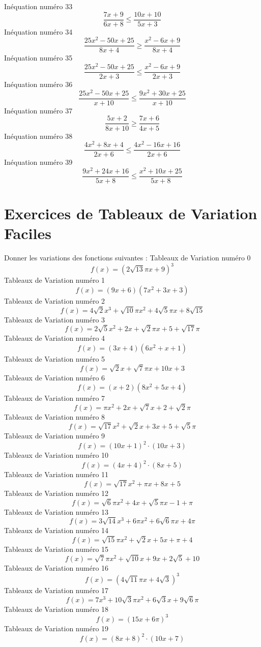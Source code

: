 \documentclass{article}
\begin{document}
\geq {}\]In\'equation num\'ero 33 \[\frac{7 x + 9}{6 x + 8} \leq \frac{10 x + 10}{5 x + 3}\]In\'equation num\'ero 34 \[\frac{25 x^{2} - 50 x + 25}{8 x + 4} \geq \frac{x^{2} - 6 x + 9}{8 x + 4}\]In\'equation num\'ero 35 \[\frac{25 x^{2} - 50 x + 25}{2 x + 3} \leq \frac{x^{2} - 6 x + 9}{2 x + 3}\]In\'equation num\'ero 36 \[\frac{25 x^{2} - 50 x + 25}{x + 10} \leq \frac{9 x^{2} + 30 x + 25}{x + 10}\]In\'equation num\'ero 37 \[\frac{5 x + 2}{8 x + 10} \geq \frac{7 x + 6}{4 x + 5}\]In\'equation num\'ero 38 \[\frac{4 x^{2} + 8 x + 4}{2 x + 6} \leq \frac{4 x^{2} - 16 x + 16}{2 x + 6}\]In\'equation num\'ero 39 \[\frac{9 x^{2} + 24 x + 16}{5 x + 8} \leq \frac{x^{2} + 10 x + 25}{5 x + 8}\]
 \section{Exercices de Tableaux de Variation Faciles}

 Donner les variations des fonctions suivantes : 
Tableaux de Variation num\'ero 0 \[f(x) = \left(2 \sqrt{13} \pi x + 9\right)^{3}\]Tableaux de Variation num\'ero 1 \[f(x) = \left(9 x + 6\right) \left(7 x^{2} + 3 x + 3\right)\]Tableaux de Variation num\'ero 2 \[f(x) = 4 \sqrt{2} x^{3} + \sqrt{10} \pi x^{2} + 4 \sqrt{5} \pi x + 8 \sqrt{15}\]Tableaux de Variation num\'ero 3 \[f(x) = 2 \sqrt{5} x^{2} + 2 x + \sqrt{2} \pi x + 5 + \sqrt{17} \pi\]Tableaux de Variation num\'ero 4 \[f(x) = \left(3 x + 4\right) \left(6 x^{2} + x + 1\right)\]Tableaux de Variation num\'ero 5 \[f(x) = \sqrt{2} x + \sqrt{7} \pi x + 10 x + 3\]Tableaux de Variation num\'ero 6 \[f(x) = \left(x + 2\right) \left(8 x^{2} + 5 x + 4\right)\]Tableaux de Variation num\'ero 7 \[f(x) = \pi x^{2} + 2 x + \sqrt{7} x + 2 + \sqrt{2} \pi\]Tableaux de Variation num\'ero 8 \[f(x) = \sqrt{17} x^{2} + \sqrt{2} x + 3 x + 5 + \sqrt{5} \pi\]Tableaux de Variation num\'ero 9 \[f(x) = \left(10 x + 1\right)^{2} \cdot \left(10 x + 3\right)\]Tableaux de Variation num\'ero 10 \[f(x) = \left(4 x + 4\right)^{2} \cdot \left(8 x + 5\right)\]Tableaux de Variation num\'ero 11 \[f(x) = \sqrt{17} x^{2} + \pi x + 8 x + 5\]Tableaux de Variation num\'ero 12 \[f(x) = \sqrt{6} \pi x^{2} + 4 x + \sqrt{5} \pi x - 1 + \pi\]Tableaux de Variation num\'ero 13 \[f(x) = 3 \sqrt{14} x^{3} + 6 \pi x^{2} + 6 \sqrt{6} \pi x + 4 \pi\]Tableaux de Variation num\'ero 14 \[f(x) = \sqrt{15} \pi x^{2} + \sqrt{2} x + 5 x + \pi + 4\]Tableaux de Variation num\'ero 15 \[f(x) = \sqrt{7} \pi x^{2} + \sqrt{10} x + 9 x + 2 \sqrt{5} + 10\]Tableaux de Variation num\'ero 16 \[f(x) = \left(4 \sqrt{11} \pi x + 4 \sqrt{3}\right)^{3}\]Tableaux de Variation num\'ero 17 \[f(x) = 7 x^{3} + 10 \sqrt{3} \pi x^{2} + 6 \sqrt{3} x + 9 \sqrt{6} \pi\]Tableaux de Variation num\'ero 18 \[f(x) = \left(15 x + 6 \pi\right)^{3}\]Tableaux de Variation num\'ero 19 \[f(x) = \left(8 x + 8\right)^{2} \cdot \left(10 x + 7\right)\]
\end{document}
